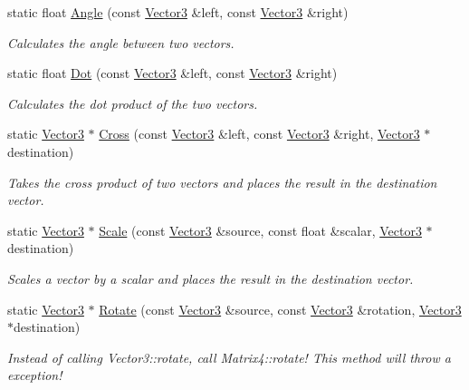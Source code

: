 \begin{DoxyCompactItemize}
static float \hyperlink{class_flounder_1_1_vector3_ad638ce06cb1619c42f6dbc2747e3749d}{Angle} (const \hyperlink{class_flounder_1_1_vector3}{Vector3} \&left, const \hyperlink{class_flounder_1_1_vector3}{Vector3} \&right)
\begin{DoxyCompactList}\small\item\em Calculates the angle between two vectors. \end{DoxyCompactList}\item 
static float \hyperlink{class_flounder_1_1_vector3_a253820fc674accfdc3364b3bcd1c5e1e}{Dot} (const \hyperlink{class_flounder_1_1_vector3}{Vector3} \&left, const \hyperlink{class_flounder_1_1_vector3}{Vector3} \&right)
\begin{DoxyCompactList}\small\item\em Calculates the dot product of the two vectors. \end{DoxyCompactList}\item 
static \hyperlink{class_flounder_1_1_vector3}{Vector3} $\ast$ \hyperlink{class_flounder_1_1_vector3_a5eeba1752b3b718a5ad8cdbf22fc668c}{Cross} (const \hyperlink{class_flounder_1_1_vector3}{Vector3} \&left, const \hyperlink{class_flounder_1_1_vector3}{Vector3} \&right, \hyperlink{class_flounder_1_1_vector3}{Vector3} $\ast$destination)
\begin{DoxyCompactList}\small\item\em Takes the cross product of two vectors and places the result in the destination vector. \end{DoxyCompactList}\item 
static \hyperlink{class_flounder_1_1_vector3}{Vector3} $\ast$ \hyperlink{class_flounder_1_1_vector3_a161d9cc23a519594e7b32eecaeebc146}{Scale} (const \hyperlink{class_flounder_1_1_vector3}{Vector3} \&source, const float \&scalar, \hyperlink{class_flounder_1_1_vector3}{Vector3} $\ast$destination)
\begin{DoxyCompactList}\small\item\em Scales a vector by a scalar and places the result in the destination vector. \end{DoxyCompactList}\item 
static \hyperlink{class_flounder_1_1_vector3}{Vector3} $\ast$ \hyperlink{class_flounder_1_1_vector3_a692c1fb0b50218de9f72094d4154ed09}{Rotate} (const \hyperlink{class_flounder_1_1_vector3}{Vector3} \&source, const \hyperlink{class_flounder_1_1_vector3}{Vector3} \&rotation, \hyperlink{class_flounder_1_1_vector3}{Vector3} $\ast$destination)
\begin{DoxyCompactList}\small\item\em Instead of calling Vector3\+::rotate, call Matrix4\+::rotate! This method will throw a exception! \end{DoxyCompactList}\item 

\end{DoxyCompactItemize}
